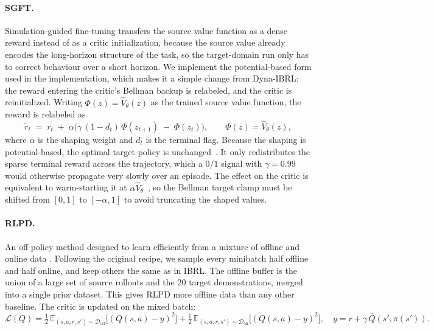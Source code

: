 \documentclass{article} %
\begin{document}
\paragraph{SGFT.}
Simulation-guided fine-tuning \citep{yin2025rapidly} transfers the source value function as a dense reward instead of as a critic initialization, because the source value already encodes the long-horizon structure of the task, so the target-domain run only has to correct behaviour over a short horizon. We implement the potential-based form used in the \citet{yin2025rapidly} implementation, which
makes it a simple change from Dyna-IBRL: the reward entering the critic's Bellman backup is relabeled, and the critic is reinitialized. Writing $\Phi(z)=\hat{V}_\theta(z)$ as the trained source value function, the reward is relabeled as
\begin{equation}
\tilde{r}_t \;=\; r_t \;+\; \alpha\big(\gamma\,(1-d_t)\,\Phi(z_{t+1}) \;-\; \Phi(z_t)\big),
\qquad \Phi(z) = \hat{V}_\theta(z),
\label{eq:sgft-shaping}
\end{equation}
where $\alpha$ is the shaping weight and $d_t$ is the terminal flag. Because the shaping is potential-based, the optimal target policy is unchanged~\citep{ng1999policy}. It only redistributes the sparse terminal reward across the trajectory, which a $0/1$ signal with $\gamma=0.99$ would otherwise propagate very slowly over an episode. The effect on the critic is equivalent to warm-starting it at $\alpha\hat{V}_\theta$~\citep{wiewiora2003potential}, so the Bellman target clamp must be shifted from $[0,1]$ to $[-\alpha, 1]$ to avoid truncating the shaped values. 
\paragraph{RLPD.}
An off-policy method designed to learn efficiently from a mixture of offline and online data \citep{ball2023efficient}. Following the original recipe, we sample every minibatch half offline and half online, and keep others the same as in IBRL. The offline buffer is the union of a large set of source rollouts and the $20$ target demonstrations, merged into a single prior dataset. This gives RLPD more offline data than any other baseline. The critic is updated on the mixed batch:
\begin{equation}
\mathcal{L}(Q) = \tfrac{1}{2}\,
\mathbb{E}_{(s,a,r,s')\sim\mathcal{D}_{\text{off}}}\!\big[(Q(s,a) - y)^2\big]
+ \tfrac{1}{2}\,
\mathbb{E}_{(s,a,r,s')\sim\mathcal{D}_{\text{on}}}\!\big[(Q(s,a) - y)^2\big],
\quad y = r + \gamma\,\bar{Q}(s',\pi(s')).
\label{eq:rlpd}
\end{equation}
\end{document}
